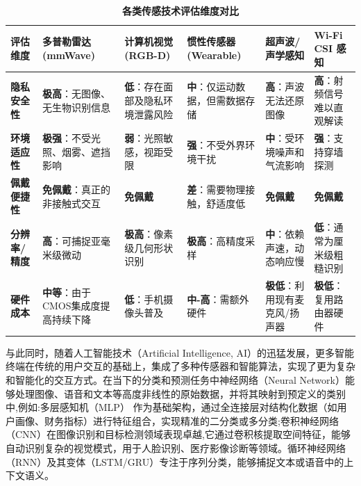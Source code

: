 \begin{table}[htbp]
    \centering
    \renewcommand{\arraystretch}{1.5}
    \caption{\bfseries 各类传感技术评估维度对比}
    \begin{tabular}{|>{\centering\arraybackslash}m{1.6cm}|>{\centering\arraybackslash}m{2.1cm}|>{\centering\arraybackslash}m{2.1cm}|>{\centering\arraybackslash}m{2.1cm}|>{\centering\arraybackslash}m{2.1cm}|>{\centering\arraybackslash}m{2.1cm}|}
    \hline
    \textbf{评估维度} & \textbf{多普勒雷达 (mmWave)} & \textbf{计算机视觉 (RGB-D)} & \textbf{惯性传感器 (Wearable)} & \textbf{超声波/声学感知} & \textbf{Wi-Fi CSI 感知} \\ \hline

    \textbf{隐私安全性} & \textbf{极高}：无图像、无生物识别信息 & \textbf{低}：存在面部及隐私环境泄露风险 & \textbf{中}：仅运动数据，但需数据存储 & \textbf{高}：声波无法还原图像 & \textbf{高}：射频信号难以直观解读 \\ \hline

    \textbf{环境适应性} & \textbf{极强}：不受光照、烟雾、遮挡影响 & \textbf{弱}：光照敏感，视距受限 & \textbf{强}：不受外界环境干扰 & \textbf{中}：受环境噪声和气流影响 & \textbf{强}：支持穿墙探测 \\ \hline

    \textbf{佩戴便捷性} & \textbf{免佩戴}：真正的非接触式交互 & \textbf{免佩戴} & \textbf{差}：需要物理接触，舒适度低 & \textbf{免佩戴} & \textbf{免佩戴} \\ \hline

    \textbf{分辨率/精度} & \textbf{高}：可捕捉亚毫米级微动 & \textbf{极高}：像素级几何形状识别 & \textbf{极高}：高精度采样 & \textbf{中}：依赖声速，动态响应慢 & \textbf{低}：通常为厘米级粗糙识别 \\ \hline

    \textbf{硬件成本} & \textbf{中等}：由于CMOS集成度提高持续下降 & \textbf{低}：手机摄像头普及 & \textbf{中-高}：需额外硬件 & \textbf{极低}：利用现有麦克风/扬声器 & \textbf{极低}：复用路由器硬件 \\ \hline
    \end{tabular}
    \label{tab:sensor_comparison}
\end{table}

与此同时，随着人工智能技术（Artificial Intelligence, AI）的迅猛发展，更多智能终端在传统的用户交互的基础上，集成了多种传感器和智能算法，实现了更为复杂和智能化的交互方式。在当下的分类和预测任务中神经网络（Neural Network）能够处理图像、语音和文本等高度非线性的原始数据，并将其映射到预定义的类别中,例如:多层感知机（MLP） 作为基础架构，通过全连接层对结构化数据（如用户画像、财务指标）进行特征组合，实现精准的二分类或多分类\cite{Taud2018MultilayerP};卷积神经网络（CNN）在图像识别和目标检测领域表现卓越,它通过卷积核提取空间特征，能够自动识别复杂的视觉模式，用于人脸识别、医疗影像诊断等领域\cite{kim-2014-convolutional}\cite{CNNreview}。循环神经网络（RNN）及其变体（LSTM/GRU）专注于序列分类，能够捕捉文本或语音中的上下文语义\cite{RNNreview}。

